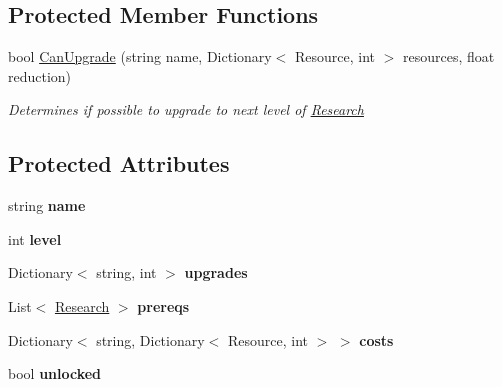 \subsection*{Protected Member Functions}
\begin{DoxyCompactItemize}
\item 
bool \hyperlink{class_research_a4587dfdaf5c7a833979bd5dc99b2df14}{Can\+Upgrade} (string name, Dictionary$<$ Resource, int $>$ resources, float reduction)
\begin{DoxyCompactList}\small\item\em Determines if possible to upgrade to next level of \hyperlink{class_research}{Research} \end{DoxyCompactList}\end{DoxyCompactItemize}
\subsection*{Protected Attributes}
\begin{DoxyCompactItemize}
\item 
\hypertarget{class_research_a9e831f2d8af6d09f73c18c4cf7a57531}{}string {\bfseries name}\label{class_research_a9e831f2d8af6d09f73c18c4cf7a57531}

\item 
\hypertarget{class_research_aa8a8d7d0ec2ba74c1c3e7456c3aa34d3}{}int {\bfseries level}\label{class_research_aa8a8d7d0ec2ba74c1c3e7456c3aa34d3}

\item 
\hypertarget{class_research_a8d836c7c08da55ce7252e930f82802ed}{}Dictionary$<$ string, int $>$ {\bfseries upgrades}\label{class_research_a8d836c7c08da55ce7252e930f82802ed}

\item 
\hypertarget{class_research_a066f8eaa069e8897235e5a6b5d42f9f9}{}List$<$ \hyperlink{class_research}{Research} $>$ {\bfseries prereqs}\label{class_research_a066f8eaa069e8897235e5a6b5d42f9f9}

\item 
\hypertarget{class_research_a74569e73f1d5433bd21e4337a02f0052}{}Dictionary$<$ string, Dictionary$<$ Resource, int $>$ $>$ {\bfseries costs}\label{class_research_a74569e73f1d5433bd21e4337a02f0052}

\item 
\hypertarget{class_research_a8cfc91c2753092d5b06ffb4f3af0fb50}{}bool {\bfseries unlocked}\label{class_research_a8cfc91c2753092d5b06ffb4f3af0fb50}

\end{DoxyCompactItemize}
